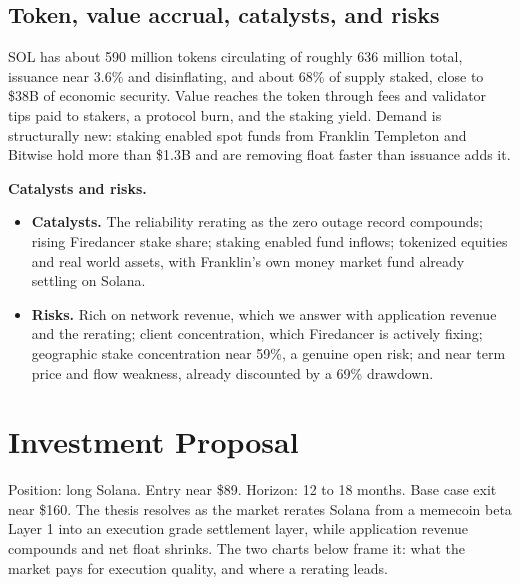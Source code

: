 \documentclass[11pt]{article}
\begin{document}
\subsection{Token, value accrual, catalysts, and risks}
SOL has about 590 million tokens circulating of roughly 636 million total, issuance near 3.6\% and disinflating, and about 68\% of supply staked, close to \$38B of economic security. Value reaches the token through fees and validator tips paid to stakers, a protocol burn, and the staking yield. Demand is structurally new: staking enabled spot funds from Franklin Templeton and Bitwise hold more than \$1.3B and are removing float faster than issuance adds it.

\textbf{Catalysts and risks.}
\begin{itemize}
  \item \textbf{Catalysts.} The reliability rerating as the zero outage record compounds; rising Firedancer stake share; staking enabled fund inflows; tokenized equities and real world assets, with Franklin's own money market fund already settling on Solana.
  \item \textbf{Risks.} Rich on network revenue, which we answer with application revenue and the rerating; client concentration, which Firedancer is actively fixing; geographic stake concentration near 59\%, a genuine open risk; and near term price and flow weakness, already discounted by a 69\% drawdown.
\end{itemize}

\section{Investment Proposal}

Position: long Solana. Entry near \$89. Horizon: 12 to 18 months. Base case exit near \$160. The thesis resolves as the market rerates Solana from a memecoin beta Layer 1 into an execution grade settlement layer, while application revenue compounds and net float shrinks. The two charts below frame it: what the market pays for execution quality, and where a rerating leads.
\end{document}
